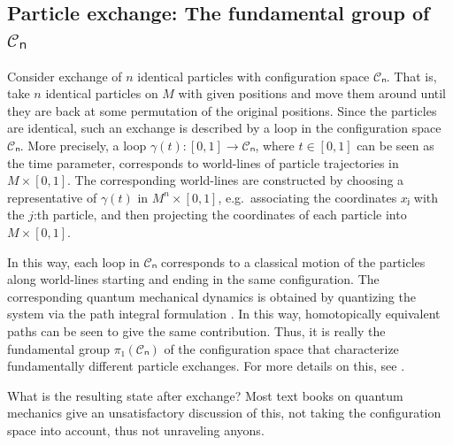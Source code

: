 \subsection{Particle exchange: The fundamental group of \texorpdfstring{$𝒞ₙ$}{C\_n}}

Consider exchange of $n$ identical particles with configuration space $𝒞ₙ$. That is, take $n$ identical particles on $M$ with given positions and move them around until they are back at some permutation of the original positions. Since the particles are identical, such an exchange is described by a loop in the configuration space $𝒞ₙ$. More precisely, a loop $γ(t) : [0,1] → 𝒞ₙ$, where $t ∈ [0,1]$ can be seen as the time parameter, corresponds to world-lines of particle trajectories in $M×[0,1]$. The corresponding world-lines are constructed by choosing a representative of $γ(t)$ in $M^n×[0,1]$, e.g.\ associating the coordinates $xⱼ$ with the $j$:th particle, and then projecting the coordinates of each particle into $M×[0,1]$.

In this way, each loop in $𝒞ₙ$ corresponds to a classical motion of the particles along world-lines starting and ending in the same configuration. The corresponding quantum mechanical dynamics is obtained by quantizing the system via the path integral formulation \cite{feynmann path integral,nakahara,feynmann path integrals indistinguishable particles,myrheim}. In this way, homotopically equivalent paths can be seen to give the same contribution. Thus, it is really the fundamental group $π₁(𝒞ₙ)$ of the configuration space that characterize fundamentally different particle exchanges. For more details on this, see \cite{configuration spaces,bonderson}.

What is the resulting state after exchange? Most text books on quantum mechanics give an unsatisfactory discussion of this, not taking the configuration space into account, thus not unraveling anyons.

